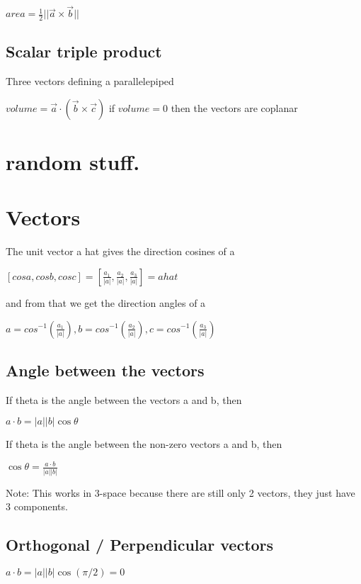 \documentclass{extarticle}
\begin{document}
$area =\frac{1}{2}||\vec{a}\times \vec{b}||$

\subsection{Scalar triple product}
Three vectors defining a parallelepiped

$volume=\vec{a}\cdot(\vec{b}\times \vec{c})$
if $volume=0$ then the vectors are coplanar

\section{random stuff.}
\section{Vectors}

\begin{tcolorbox}[enhanced jigsaw,sharp corners,coltext=black,colback=Red!25!white,boxrule=0pt,breakable,size=minimal]
The unit vector a hat gives the direction cosines of a

$[cos a,cos b,cos c]=[\frac{a_1}{|a|},\frac{a_2}{|a|},\frac{a_3}{|a|}]= a hat$

and from that we get the direction angles of a

$a=cos^{-1}(\frac{a_1}{|a|}), b=cos^{-1}(\frac{a_2}{|a|}), c=cos^{-1}(\frac{a_3}{|a|})$
\end{tcolorbox}

\subsection{Angle between the vectors}

If theta is the angle between the vectors a and b, then

$a\cdot b=\left|a\right|\left|b\right|\cos{\theta}$

If theta is the angle between the non-zero vectors a and b, then

$\cos{\theta}=\frac{a\cdot b}{\left|a\right|\left|b\right|}$

Note: This works in 3-space because there are still only 2 vectors, they just have 3 components.

\subsection{Orthogonal / Perpendicular vectors}

$a\cdot b=\left|a\right|\left|b\right|\cos{\left(\pi/2\right)}=0$
\end{document}
